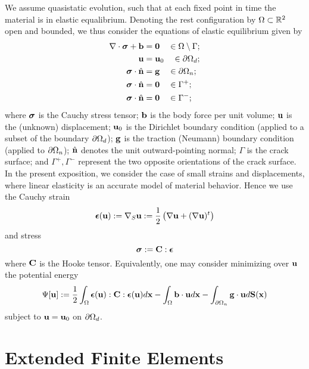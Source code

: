 We assume quasistatic evolution, such that at each fixed point in time the material is in elastic equalibrium. Denoting the rest configuration by $\Omega \subset \mathbb{R}^2$ open and bounded, we thus consider the equations of elastic equilibrium given by
\begin{align*}
\nabla \cdot \boldsymbol{\sigma} + \mathbf{b} & = \mathbf{0} \quad \in \Omega \setminus \Gamma; \\
\mathbf{u} & = \mathbf{u}_0 \quad \in \partial\Omega_d; \\
\boldsymbol{\sigma} \cdot \hat{\mathbf{n}} & = \mathbf{g} \quad \in \partial\Omega_n; \\
\boldsymbol{\sigma} \cdot \hat{\mathbf{n}} & = \mathbf{0} \quad \in \Gamma^+; \\
\boldsymbol{\sigma} \cdot \hat{\mathbf{n}} & = \mathbf{0} \quad \in \Gamma^-;
\end{align*}
where $\boldsymbol{\sigma}$ is the Cauchy stress tensor; $\mathbf{b}$ is the body force per unit volume; $\mathbf{u}$ is the (unknown) displacement; $\mathbf{u}_0$ is the Dirichlet boundary condition (applied to a subset of the boundary $\partial\Omega_d$); $\mathbf{g}$ is the traction (Neumann) boundary condition (applied to $\partial\Omega_n$); $\hat{\mathbf{n}}$ denotes the unit outward-pointing normal; $\Gamma$ is the crack surface; and $\Gamma^+, \Gamma^-$ represent the two opposite orientations of the crack surface. In the present exposition, we consider the case of small strains and displacements, where linear elasticity is an accurate model of material behavior. Hence we use the Cauchy strain
\begin{equation*}
\boldsymbol{\epsilon}(\mathbf{u}) := \nabla_S \mathbf{u} := \frac{1}{2} \left( \nabla \mathbf{u} + (\nabla \mathbf{u})^t \right)
\end{equation*}
and stress
\begin{equation*}
\boldsymbol{\sigma} := \mathbf{C} : \boldsymbol{\epsilon}
\end{equation*}
where $\mathbf{C}$ is the Hooke tensor. Equivalently, one may consider minimizing over $\mathbf{u}$ the potential energy
\begin{equation} \label{eq:chap1.energy}
\Psi[\mathbf{u}] := \frac{1}{2} \int_{\Omega} \boldsymbol{\epsilon}(\mathbf{u}) : \mathbf{C} : \boldsymbol{\epsilon}(\mathbf{u}) d\mathbf{x} - \int_{\Omega} \mathbf{b} \cdot \mathbf{u} d\mathbf{x} - \int_{\partial\Omega_n} \mathbf{g} \cdot \mathbf{u} d\mathbf{S}(\mathbf{x})
\end{equation}
subject to $\mathbf{u} = \mathbf{u}_0$ on $\partial\Omega_d$.

\section{Extended Finite Elements} \label{sec:chap1.xfem}

